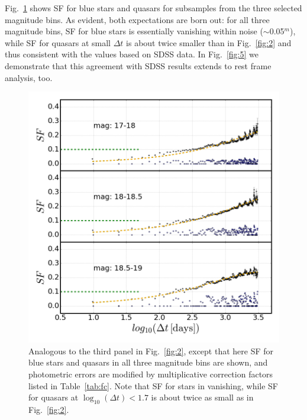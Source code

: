 \documentclass[fleqn,usenatbib]{mnras}  %
\begin{document}
Fig.~\ref{fig:4} shows SF for blue stars and quasars for subsamples from the three selected magnitude bins. 
As evident, both expectations are born out: for all three magnitude bins, SF for blue stars is essentially 
vanishing within noise ($\sim$0.05$^m$), while SF for quasars at small $\Delta t$ is about twice smaller 
than in Fig.~\ref{fig:2} and thus consistent with the values based on SDSS data. In Fig.~\ref{fig:5} we 
demonstrate that this agreement with SDSS results extends to rest frame analysis, too. 

\begin{figure}
\vskip -0.15in
\includegraphics[width=1.1\columnwidth, center]{Fig_4_SF_QSO_starsB_r_cut.png}
\caption{Analogous to the third panel in Fig.~\ref{fig:2}, except that here SF for blue stars and quasars in
all three magnitude bins are shown, and photometric errors are modified by multiplicative correction factors 
listed in Table~\ref{tab:fc}. Note that SF for stars in vanishing, while SF for quasars at $\log_{10}(\Delta t) < 1.7$  
is about twice as small as in Fig.~\ref{fig:2}.} 
\label{fig:4}
\end{figure}
\end{document}
